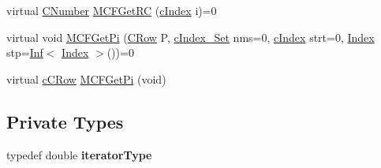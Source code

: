 \begin{DoxyCompactItemize}
virtual \mbox{\hyperlink{class_m_c_f_class_a24d0627ba8213afe1ec4ebeb4508e8f1}{C\+Number}} \mbox{\hyperlink{class_m_c_f_simplex_a7c103b582c910ccfda354032aae5722e}{M\+C\+F\+Get\+RC}} (\mbox{\hyperlink{class_m_c_f_class_a76aaabb20535c51a2752b93f6c38fe54}{c\+Index}} i)=0
\item 
virtual void \mbox{\hyperlink{class_m_c_f_simplex_a8c573c04800332c86ea31aeb80bbd7b1}{M\+C\+F\+Get\+Pi}} (\mbox{\hyperlink{class_m_c_f_class_a62409402be4e4b301e1a568f99f877be}{C\+Row}} P, \mbox{\hyperlink{class_m_c_f_class_a81575b2d4e4d5636b17170432150ae69}{c\+Index\+\_\+\+Set}} nms=0, \mbox{\hyperlink{class_m_c_f_class_a76aaabb20535c51a2752b93f6c38fe54}{c\+Index}} strt=0, \mbox{\hyperlink{class_m_c_f_class_ad53d6229d7ec28555a9c9c2fd9abf773}{Index}} stp=\mbox{\hyperlink{class_o_p_ttypes__di__unipi__it_1_1_inf}{Inf}}$<$ \mbox{\hyperlink{class_m_c_f_class_ad53d6229d7ec28555a9c9c2fd9abf773}{Index}} $>$())=0
\item 
virtual \mbox{\hyperlink{class_m_c_f_class_ab700102e9ba8bb6015be6818d4e99097}{c\+C\+Row}} \mbox{\hyperlink{class_m_c_f_simplex_a8f1a95d5c707f83ffc6aecba1e7e0e10}{M\+C\+F\+Get\+Pi}} (void)
\end{DoxyCompactItemize}
\subsection*{Private Types}
\begin{DoxyCompactItemize}
\item 
\mbox{\label{class_m_c_f_simplex_a26c96d343a58276bcbbcfb52874590a4}} 
typedef double {\bfseries iterator\+Type}
\end{DoxyCompactItemize}
